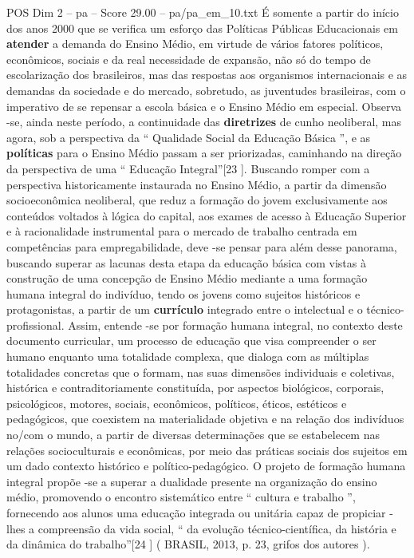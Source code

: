 \begin{textsample}{POS Dim 2 – pa – Score 29.00 – pa/pa\_em\_10.txt}
É somente a partir do início dos anos 2000 que se verifica um esforço das Políticas Públicas Educacionais em \textbf{atender} a demanda do Ensino Médio, em virtude de vários fatores políticos, econômicos, sociais e da real necessidade de expansão, não só do tempo de escolarização dos brasileiros, mas das respostas aos organismos internacionais e as demandas da sociedade e do mercado, sobretudo, as juventudes brasileiras, com o imperativo de se repensar a escola básica e o Ensino Médio em especial.
Observa -se, ainda neste período, a continuidade das \textbf{diretrizes} de cunho neoliberal, mas agora, sob a perspectiva da “ Qualidade Social da Educação Básica ”, e as \textbf{políticas} para o Ensino Médio passam a ser priorizadas, caminhando na direção da perspectiva de uma “ Educação Integral”[23 ].
Buscando romper com a perspectiva historicamente instaurada no Ensino Médio, a partir da dimensão socioeconômica neoliberal, que reduz a formação do jovem exclusivamente aos conteúdos voltados à lógica do capital, aos exames de acesso à Educação Superior e à racionalidade instrumental para o mercado de trabalho centrada em competências para empregabilidade, deve -se pensar para além desse panorama, buscando superar as lacunas desta etapa da educação básica com vistas à construção de uma concepção de Ensino Médio mediante a uma formação humana integral do indivíduo, tendo os jovens como sujeitos históricos e protagonistas, a partir de um \textbf{currículo} integrado entre o intelectual e o técnico-profissional.
Assim, entende -se por formação humana integral, no contexto deste documento curricular, um processo de educação que visa compreender o ser humano enquanto uma totalidade complexa, que dialoga com as múltiplas totalidades concretas que o formam, nas suas dimensões individuais e coletivas, histórica e contraditoriamente constituída, por aspectos biológicos, corporais, psicológicos, motores, sociais, econômicos, políticos, éticos, estéticos e pedagógicos, que coexistem na materialidade objetiva e na relação dos indivíduos no/com o mundo, a partir de diversas determinações que se estabelecem nas relações socioculturais e econômicas, por meio das práticas sociais dos sujeitos em um dado contexto histórico e político-pedagógico.
O projeto de formação humana integral propõe -se a superar a dualidade presente na organização do ensino médio, promovendo o encontro sistemático entre “ cultura e trabalho ”, fornecendo aos alunos uma educação integrada ou unitária capaz de propiciar -lhes a compreensão da vida social, “ da evolução técnico-científica, da história e da dinâmica do trabalho”[24 ] ( BRASIL, 2013, p. 23, grifos dos autores ).

\end{textsample}
